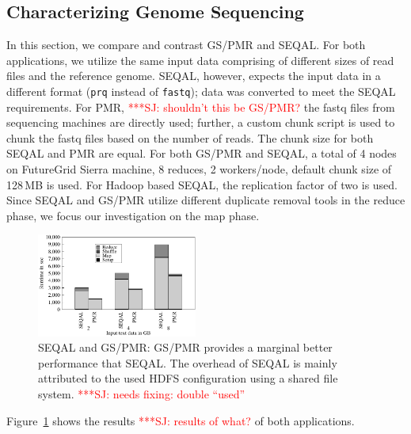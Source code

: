 \documentclass{acm_proc_article-sp}
\newcommand{\jhanote}[1]{ {\textcolor{red} { ***SJ: #1 }}}
\newcommand{\jhanote}[1]{}
\newcommand{\upp}{\vspace*{-0.5em}}
\begin{document}
\upp\upp
\subsection{Characterizing Genome Sequencing}

In this section, we compare and contrast GS/PMR and SEQAL. For both
applications, we utilize the same input data comprising of different
sizes of read files and the reference genome. SEQAL, however, expects
the input data in a different format (\texttt{prq} instead of
\texttt{fastq}); data was converted to meet the SEQAL
requirements. For PMR, \jhanote{shouldn't this be GS/PMR?} the fastq
files from sequencing machines are directly used; further, a custom
chunk script is used to chunk the fastq files based on the number of
reads. The chunk size for both SEQAL and PMR are equal. For both
GS/PMR and SEQAL, a total of 4 nodes on FutureGrid Sierra machine, 8
reduces, 2 workers/node, default chunk size of 128\,MB is used. For
Hadoop based SEQAL, the replication factor of two is used.  Since
SEQAL and GS/PMR utilize different duplicate removal tools in the
reduce phase, we focus our investigation on the map phase.


\begin{figure}[ht]
	\centering
		\includegraphics[width=0.47\textwidth]{figures/gs_seq_pmr.pdf}
\caption{SEQAL and GS/PMR: GS/PMR provides a marginal better
  performance that SEQAL. The overhead of SEQAL is mainly attributed
  to the used HDFS configuration using a shared file
  system.\jhanote{needs fixing: double ``used''}\upp }
\label{fig:gs_seq_pmr}
\end{figure}		

Figure~\ref{fig:gs_seq_pmr} shows the results \jhanote{results of
  what?} of both applications.
\end{document}

